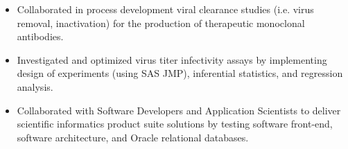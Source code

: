 \documentclass[10pt,a4paper]{altacv}
\begin{document}






\begin{itemize}
    \item   \small{Collaborated in process development viral clearance studies (i.e. virus removal, inactivation) for the production of therapeutic monoclonal antibodies.}
    \item   \small{Investigated and optimized virus titer infectivity assays by implementing design of experiments (using SAS JMP), inferential statistics, and regression analysis.}
\end{itemize}

\medskip



\begin{itemize}
    \item   \small{Collaborated with Software Developers and Application Scientists to deliver scientific informatics product suite solutions by testing software front-end, software architecture, and Oracle relational databases.}
\end{itemize}
\end{document}
